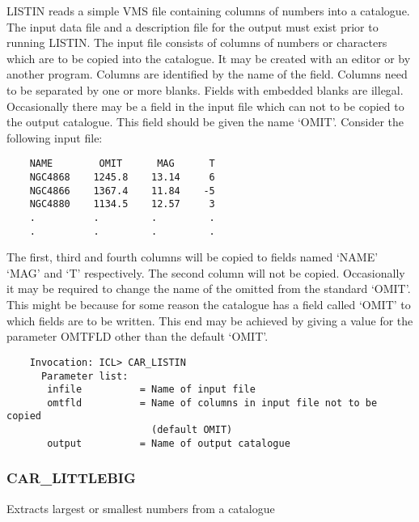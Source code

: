 LISTIN reads a simple VMS file containing columns of numbers into a
catalogue. The input data file and a description file for the output
must exist prior to running LISTIN.
The input file consists of columns of numbers or characters which are to
be copied into the catalogue.
It may be created with an editor or by another program.
Columns are identified by the name of the field.
Columns need to be separated by one or more blanks.
Fields with embedded blanks are illegal.
Occasionally there may be a field in the input file which can not
to be copied to the output catalogue.
This field should be given the name `OMIT'.
Consider the following input file:
\begin{verbatim}
    NAME        OMIT      MAG      T
    NGC4868    1245.8    13.14     6
    NGC4866    1367.4    11.84    -5
    NGC4880    1134.5    12.57     3
    .          .         .         .
    .          .         .         .
\end{verbatim}
The first, third and fourth columns will be copied to fields named `NAME'
`MAG' and `T' respectively.
The second column will not be copied.
Occasionally it may be required to change the name of the omitted
from the standard `OMIT'.
This might be because for some reason the catalogue has a field called
`OMIT' to which fields are to be written.
This end may be achieved by giving a value for the parameter OMTFLD other
than the default `OMIT'.
\begin{verbatim}
    Invocation: ICL> CAR_LISTIN
      Parameter list:
       infile          = Name of input file
       omtfld          = Name of columns in input file not to be copied
                         (default OMIT)
       output          = Name of output catalogue
\end{verbatim}

\subsubsection{CAR\_LITTLEBIG}

Extracts largest or smallest numbers from a catalogue

